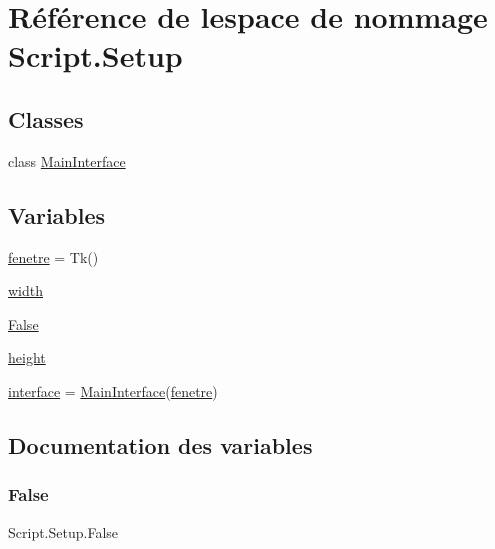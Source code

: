 \hypertarget{namespaceScript_1_1Setup}{}\section{Référence de l\textquotesingle{}espace de nommage Script.\+Setup}
\label{namespaceScript_1_1Setup}
\subsection*{Classes}
\begin{DoxyCompactItemize}
\item 
class \hyperlink{classScript_1_1Setup_1_1MainInterface}{Main\+Interface}
\end{DoxyCompactItemize}
\subsection*{Variables}
\begin{DoxyCompactItemize}
\item 
\hyperlink{namespaceScript_1_1Setup_a29d68f31a39926032c0d32fe3ea0c4eb}{fenetre} = Tk()
\item 
\hyperlink{namespaceScript_1_1Setup_a430ab18615fdd48075635baef7ed6832}{width}
\item 
\hyperlink{namespaceScript_1_1Setup_a21f36134f509add0c0704c2ed5ea51fc}{False}
\item 
\hyperlink{namespaceScript_1_1Setup_a334aa187cc8c0b7354d8f6b33894d575}{height}
\item 
\hyperlink{namespaceScript_1_1Setup_a11f256776bccf507b8e83363360c8ff7}{interface} = \hyperlink{classScript_1_1Setup_1_1MainInterface}{Main\+Interface}(\hyperlink{namespaceScript_1_1Setup_a29d68f31a39926032c0d32fe3ea0c4eb}{fenetre})
\end{DoxyCompactItemize}


\subsection{Documentation des variables}
\mbox{\label{namespaceScript_1_1Setup_a21f36134f509add0c0704c2ed5ea51fc}} 
\subsubsection{\texorpdfstring{False}{False}}
{\footnotesize\ttfamily Script.\+Setup.\+False}



